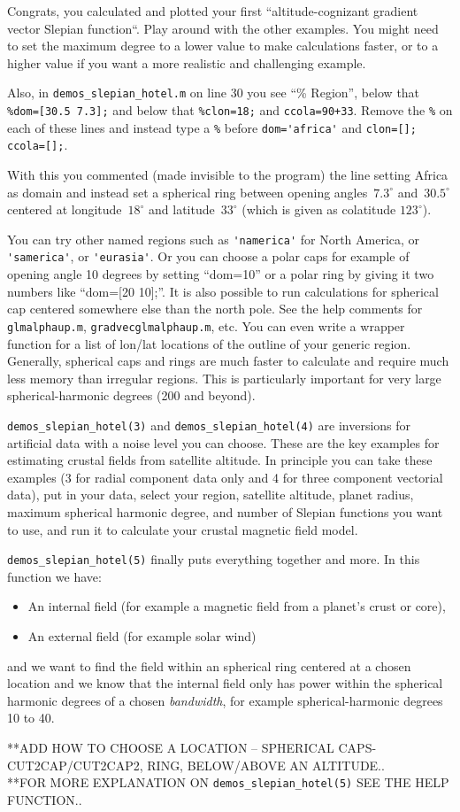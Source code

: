 \documentclass[11pt]{article}
\begin{document}
Congrats, you calculated and plotted your first ``altitude-cognizant
gradient vector Slepian function``. Play around with the other
examples. You might need to set the maximum degree to a lower value to
make calculations faster, or to a higher value if you want a more
realistic and challenging example.

Also, in \verb#demos_slepian_hotel.m# on line 30 you see ``\% Region'',
below that \verb+%dom=[30.5 7.3];+ and below that \verb+%clon=18;+ and
\verb#ccola=90+33#. Remove the \verb+%+ on each of these lines and
instead type a \verb+%+ before \verb+dom='africa'+ and
\verb+clon=[]; ccola=[];+.

With this you commented (made invisible to the program) the line
setting Africa as domain and instead set a spherical ring between
opening angles~$7.3^\circ$ and~$30.5^\circ$ centered at
longitude~$18^\circ$ and latitude~$33^\circ$ (which is given as
colatitude $123^\circ$).

You can try other named regions such as \verb#'namerica'# for North America,
or \verb#'samerica'#, or \verb#'eurasia'#. Or you can choose a polar caps for
example of opening angle 10 degrees by setting ``dom=10'' or a polar
ring by giving it two numbers like ``dom=[20 10];''. It is also
possible to run calculations for spherical cap centered somewhere else
than the north pole. See the help comments for \verb+glmalphaup.m+,
\verb+gradvecglmalphaup.m+, etc. You can even write a wrapper function
for a list of lon/lat locations of the outline of your generic
region. Generally, spherical caps and rings are much faster to
calculate and require much less memory than irregular regions. This is
particularly important for very large spherical-harmonic degrees (200
and beyond).

\verb+demos_slepian_hotel(3)+ and \verb+demos_slepian_hotel(4)+ are inversions for
artificial data with a noise level you can choose. These are the key
examples for estimating crustal fields from satellite altitude. In
principle you can take these examples (3 for radial component data
only and 4 for three component vectorial data), put in your data,
select your region, satellite altitude, planet radius, maximum
spherical harmonic degree, and number of Slepian functions you want to
use, and run it to calculate your crustal magnetic field model.

\verb+demos_slepian_hotel(5)+ finally puts everything together and
more. In this function we have:

\begin{itemize}
  \item An internal field (for example a
    magnetic field from a planet's crust or core),
  \item An external field (for example solar wind)
\end{itemize}
and we want to find the field within an spherical ring centered at a
chosen location and we know that the internal field only has power
within the spherical harmonic degrees of a chosen \emph{bandwidth},
for example spherical-harmonic degrees 10 to 40.

**ADD HOW TO CHOOSE A LOCATION -- SPHERICAL CAPS-CUT2CAP/CUT2CAP2, RING, BELOW/ABOVE AN ALTITUDE.. \\
**FOR MORE EXPLANATION ON \verb+demos_slepian_hotel(5)+ SEE THE HELP FUNCTION..
\end{document}

